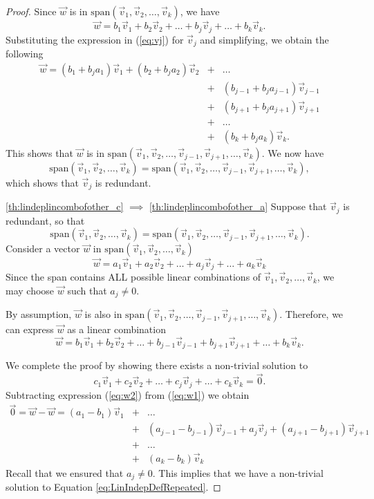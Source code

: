 \documentclass{ximera}
\begin{document}
\begin{proof}
Since $\vec{w}$ is in $\mbox{span}\left(\vec{v}_1,\vec{v}_2,\dots,\vec{v}_k\right)$, we have
$$\vec{w}=b_1\vec{v}_1+b_2\vec{v}_2+\dots +b_j\vec{v}_j+\dots +b_k\vec{v}_k.$$
Substituting the expression in (\ref{eq:vj}) for $\vec{v}_j$ and simplifying, we obtain the following
\begin{eqnarray*}\vec{w}=(b_1+b_ja_1)\vec{v}_1+(b_2+b_ja_2)\vec{v}_2&+&\dots\\
&+&(b_{j-1}+b_ja_{j-1})\vec{v}_{j-1}\\
&+&(b_{j+1}+b_ja_{j+1})\vec{v}_{j+1}\\
&+&\dots\\
&+&(b_k+b_ja_k)\vec{v}_k.\end{eqnarray*}
This shows that $\vec{w}$ is in $\mbox{span}\left(\vec{v}_1,\vec{v}_2,\dots,\vec{v}_{j-1},\vec{v}_{j+1},\dots,\vec{v}_k\right)$.
We now have 
$$\mbox{span}\left(\vec{v}_1,\vec{v}_2,\dots,\vec{v}_k\right)=\mbox{span}\left(\vec{v}_1,\vec{v}_2,\dots,\vec{v}_{j-1},\vec{v}_{j+1},\dots,\vec{v}_k\right),$$
which shows that $\vec{v}_j$ is redundant.

 \ref{th:lindeplincombofother_c} $\implies$ \ref{th:lindeplincombofother_a}  Suppose that $\vec{v}_j$ is redundant, so that
 $$\mbox{span}\left(\vec{v}_1,\vec{v}_2,\dots,\vec{v}_k\right)=\mbox{span}\left(\vec{v}_1,\vec{v}_2,\dots,\vec{v}_{j-1},\vec{v}_{j+1},\dots,\vec{v}_k\right).$$
 Consider a vector $\vec{w}$ in $\mbox{span}\left(\vec{v}_1,\vec{v}_2,\dots,\vec{v}_k\right)$  
\begin{equation}\label{eq:w1}
\vec{w}=a_1\vec{v}_1+a_2\vec{v}_2+\dots +a_j\vec{v}_j+\dots +a_k\vec{v}_k
\end{equation}
Since the span contains ALL possible linear combinations of $\vec{v}_1,\vec{v}_2,\dots,\vec{v}_k$, we may choose $\vec{w}$ such that $a_j\neq 0$.

By assumption, $\vec{w}$ is also in $\mbox{span}\left(\vec{v}_1,\vec{v}_2,\dots,\vec{v}_{j-1},\vec{v}_{j+1},\dots,\vec{v}_k\right)$.  Therefore, we can express $\vec{w}$ as a linear combination 
\begin{equation}\label{eq:w2}
\vec{w}=b_1\vec{v}_1+b_2\vec{v}_2+\dots +b_{j-1}\vec{v}_{j-1}+b_{j+1}\vec{v}_{j+1}+\dots +b_k\vec{v}_k.
\end{equation}

 We complete the proof by showing there exists a non-trivial solution to 
\begin{equation}\label{eq:LinIndepDefRepeated}
c_1\vec{v}_1+c_2\vec{v}_2+\ldots +c_j\vec{v}_j+\ldots +c_k\vec{v}_k=\vec{0}.\end{equation}  Subtracting expression (\ref{eq:w2}) from (\ref{eq:w1}) we obtain
\begin{eqnarray*}
    \vec{0}=\vec{w}-\vec{w}=(a_1-b_1)\vec{v}_1&+&\dots\\ \nonumber
    &+&(a_{j-1}-b_{j-1})\vec{v}_{j-1}+a_j\vec{v}_j+(a_{j+1}-b_{j+1})\vec{v}_{j+1}\\ \nonumber
  &+&\dots\\ \nonumber
  &+&(a_k-b_k)\vec{v}_k
\end{eqnarray*}
Recall that we ensured that $a_j\neq 0$.  This implies that we have a non-trivial solution to Equation \ref{eq:LinIndepDefRepeated}.


\end{proof}
\end{document}
